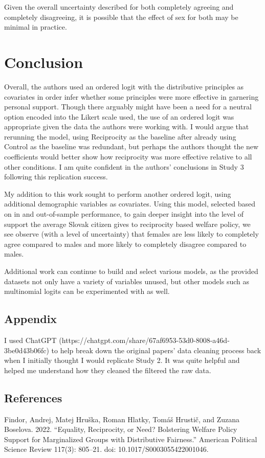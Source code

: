 \documentclass{article}
\begin{document}
Given the overall uncertainty described for both completely agreeing and completely disagreeing, it is possible that the effect of sex for both may be minimal in practice.

\section{Conclusion}

Overall, the authors used an ordered logit with the distributive principles as covariates in order infer whether some principles were more effective in garnering personal support. Though there arguably might have been a need for a neutral option encoded into the Likert scale used, the use of an ordered logit was appropriate given the data the authors were working with. I would argue that rerunning the model, using Reciprocity as the baseline after already using Control as the baseline was redundant, but perhaps the authors thought the new coefficients would better show how reciprocity was more effective relative to all other conditions. I am quite confident in the authors' conclusions in Study 3 following this replication success.

My addition to this work sought to perform another ordered logit, using additional demographic variables as covariates. Using this model, selected based on in and out-of-sample performance, to gain deeper insight into the level of support the average Slovak citizen gives to reciprocity based welfare policy, we see observe (with a level of uncertainty) that females are less likely to completely agree compared to males and more likely to completely disagree compared to males. 

Additional work can continue to build and select various models, as the provided datasets not only have a variety of variables unused, but other models such as multinomial logits can be experimented with as well. 


\subsection{Appendix}

I used ChatGPT (https://chatgpt.com/share/67af6953-53d0-8008-a46d-3be0d43b06fc) to help break down the original papers' data cleaning process back when I initially thought I would replicate Study 2. It was quite helpful and helped me understand how they cleaned the filtered the raw data.

\subsection{References}
\begin{hangparas}{.25in}{1}
Findor, Andrej, Matej Hruška, Roman Hlatky, Tomáš Hrustič, and Zuzana Boselova. 2022. “Equality, Reciprocity, or Need? Bolstering Welfare Policy Support for Marginalized Groups with Distributive Fairness.” American Political Science Review 117(3): 805–21. doi: 10.1017/S0003055422001046.
\end{hangparas}
\end{document}
